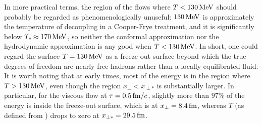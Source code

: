 \documentclass[12pt]{article}
\begin{document}
In more practical terms, the region of the flows where $T < 130\,{\rm MeV}$ should probably be regarded as phenomenologically unuseful: $130\,{\rm MeV}$ is approximately the temperature of decoupling in a Cooper-Frye treatment, and it is significantly below $T_c \approx 170\,{\rm MeV}$, so neither the conformal approximation nor the hydrodynamic approximation is any good when $T < 130\,{\rm MeV}$.  In short, one could regard the surface $T = 130\,{\rm MeV}$ as a freeze-out surface beyond which the true degrees of freedom are nearly free hadrons rather than a locally equilibrated fluid.  It is worth noting that at early times, most of the energy is in the region where $T>130\,{\rm MeV}$, even though the region $x_\perp < x_{\perp*}$ is substantially larger.  In particular, for the viscous flow at $\tau = 0.5\,{\rm fm}/c$, slightly more than $97\%$ of the energy is inside the freeze-out surface, which is at $x_\perp = 8.4\,{\rm fm}$, whereas $T$ (as defined from ) drops to zero at $x_{\perp*} = 29.5\,{\rm fm}$.
\end{document}

